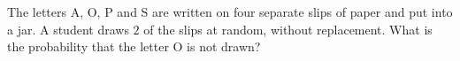 The letters A, O, P and S are written on four separate slips of paper and put into a jar. A student draws $2$ of the slips at random, without replacement. What is the probability that the letter O is not drawn?
